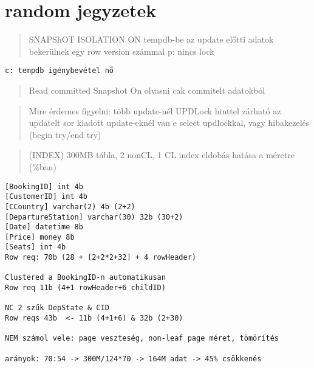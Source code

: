 \documentclass[
]{article}
\begin{document}
\hypertarget{random-jegyzetek}{%
\section{random jegyzetek}\label{random-jegyzetek}}

\begin{quote}
SNAPShOT ISOLATION ON tempdb-be az update előtti adatok bekerülnek egy
row version számmal p: nincs lock
\end{quote}

\begin{verbatim}
c: tempdb igénybevétel nő
\end{verbatim}

\begin{quote}
Read committed Snapshot On olvasni cak commitelt adatokból
\end{quote}

\begin{quote}
Mire érdemes figyelni: több update-nél UPDLock hinttel zárható az
updatelt sor kiadott update-eknél van e select updlockkal, vagy
hibakezelés (begin try/end try)
\end{quote}

\begin{quote}
(INDEX) 300MB tábla, 2 nonCL, 1 CL index eldobás hatása a méretre
(\%ban)
\end{quote}

\begin{verbatim}
[BookingID] int 4b
[CustomerID] int 4b
[CCountry] varchar(2) 4b (2+2)
[DepartureStation] varchar(30) 32b (30+2)
[Date] datetime 8b
[Price] money 8b
[Seats] int 4b 
Row req: 70b (28 + [2+2*2+32] + 4 rowHeader)

Clustered a BookingID-n automatikusan
Row req 11b (4+1 rowHeader+6 childID)

NC 2 szűk DepState & CID
Row reqs 43b  <- 11b (4+1+6) & 32b (2+30)

NEM számol vele: page veszteség, non-leaf page méret, tömörítés

arányok: 70:54 -> 300M/124*70 -> 164M adat -> 45% csökkenés
\end{verbatim}

\renewcommand*\contentsname{Tartalomjegyzék}
{
\hypersetup{linkcolor=}
\setcounter{tocdepth}{3}
\tableofcontents
}
\end{document}
